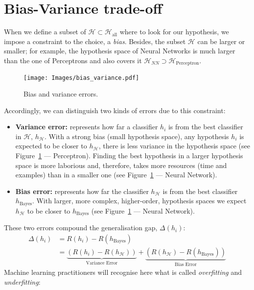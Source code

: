 \documentclass[
  letterpaper,
  12pt,
  british]{tufte-book}
\theoremstyle{plain}
\theoremstyle{definition}
\theoremstyle{plain}
\theoremstyle{remark}
\begin{document}
\hypertarget{sec-bias-variance}{%
\section{Bias-Variance trade-off}\label{sec-bias-variance}}

When we define a subset of
\(\mathcal{H}\subset \mathcal{H}_{\text{all}}\) where to look for our
hypothesis, we impose a constraint to the choice, a \emph{bias}.
Besides, the subset \(\mathcal{H}\) can be larger or smaller; for
example, the hypothesis space of Neural Networks is much larger than the
one of Perceptrons and also covers it
\(\mathcal{H}_{NN} \supset \mathcal{H}_{\text{Perceptron}}\).

\begin{figure}

{\centering \texttt{[image: Images/bias\_variance.pdf]}

}

\caption{\label{fig-bias_variance}Bias and variance errors.}

\end{figure}

Accordingly, we can distinguish two kinds of errors due to this
constraint:

\begin{itemize}
\item
  \textbf{Variance error:} represents how far a classifier \(h_i\) is
  from the best classifier in \(\mathcal{H}\), \(h_\mathcal{H}\). With a
  strong bias (small hypothesis space), any hypothesis \(h_i\) is
  expected to be closer to \(h_\mathcal{H}\), there is less variance in
  the hypothesis space (see Figure~\ref{fig-bias_variance} ---
  Perceptron). Finding the best hypothesis in a larger hypothesis space
  is more laborious and, therefore, takes more resources (time and
  examples) than in a smaller one (see Figure~\ref{fig-bias_variance}
  --- Neural Network).
\item
  \textbf{Bias error:} represents how far the classifier
  \(h_\mathcal{H}\) is from the best classifier \(h_{\text{Bayes}}\).
  With larger, more complex, higher-order, hypothesis spaces we expect
  \(h_\mathcal{H}\) to be closer to \(h_{\text{Bayes}}\) (see
  Figure~\ref{fig-bias_variance} --- Neural Network).
\end{itemize}

These two errors compound the generalisation gap, \(\Delta(h_i)\):
\begin{align}
    \Delta(h_i) &= R(h_i)-R(h_{\text{Bayes}}) \\
    &= \underbrace{(R(h_i)-R(h_\mathcal{H}))}_{\text{Variance Error}}+ \underbrace{(R(h_\mathcal{H})-R(h_{\text{Bayes}}) )}_{\text{Bias Error}}
\end{align} Machine learning practitioners will recognise here what is
called \emph{overfitting} and \emph{underfitting}:
\end{document}
